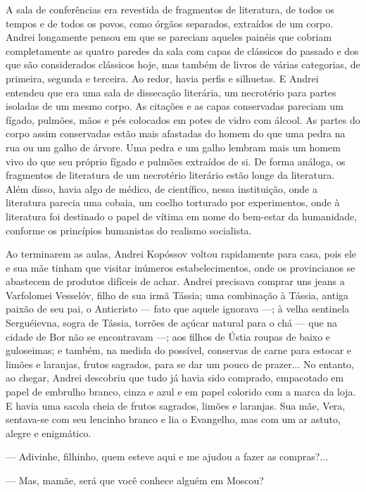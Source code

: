 A sala de conferências era revestida de fragmentos de literatura, de
todos os tempos e de todos os povos, como órgãos separados, extraídos de
um corpo. Andrei longamente pensou em que se pareciam aqueles painéis
que cobriam completamente as quatro paredes da sala com capas de
clássicos do passado e dos que são considerados clássicos hoje, mas
também de livros de várias categorias, de primeira, segunda e terceira.
Ao redor, havia perfis e silhuetas. E Andrei entendeu que era uma sala
de dissecação literária, um necrotério para partes isoladas de um mesmo
corpo. As citações e as capas conservadas pareciam um fígado, pulmões,
mãos e pés colocados em potes de vidro com álcool. As partes do corpo
assim conservadas estão mais afastadas do homem do que uma pedra na rua
ou um galho de árvore. Uma pedra e um galho lembram mais um homem vivo
do que seu próprio fígado e pulmões extraídos de si. De forma análoga,
os fragmentos de literatura de um necrotério literário estão longe da
literatura. Além disso, havia algo de médico, de científico, nessa
instituição, onde a literatura parecia uma cobaia, um coelho torturado
por experimentos, onde à literatura foi destinado o papel de vítima em
nome do bem-estar da humanidade, conforme os princípios humanistas do
realismo socialista.

Ao terminarem as aulas, Andrei Kopóssov voltou rapidamente para casa,
pois ele e sua mãe tinham que visitar inúmeros estabelecimentos, onde os
provincianos se abastecem de produtos difíceis de achar. Andrei
precisava comprar uns jeans a Varfolomei Vesselóv, filho de sua irmã
Tássia; uma combinação à Tássia, antiga paixão de seu pai, o Anticristo
--- fato que aquele ignorava ---; à velha sentinela Serguéievna, sogra
de Tássia, torrões de açúcar natural para o chá --- que na cidade de Bor
não se encontravam ---; aos filhos de Ústia roupas de baixo e
guloseimas; e também, na medida do possível, conservas de carne para
estocar e limões e laranjas, frutos sagrados, para se dar um pouco de
prazer... No entanto, ao chegar, Andrei descobriu que tudo já havia sido
comprado, empacotado em papel de embrulho branco, cinza e azul e em
papel colorido com a marca da loja. E havia uma sacola cheia de frutos
sagrados, limões e laranjas. Sua mãe, Vera, sentava-se com seu lencinho
branco e lia o Evangelho, mas com um ar astuto, alegre e enigmático.

--- Adivinhe, filhinho, quem esteve aqui e me ajudou a fazer as
compras?...

--- Mas, mamãe, será que você conhece alguém em Moscou?

